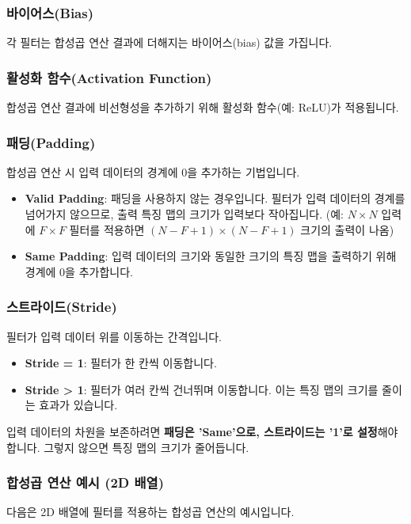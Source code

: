 \documentclass[11pt,a4paper]{article}
\theoremstyle{definition}
\begin{document}
\subsubsection{바이어스(Bias)}
각 필터는 합성곱 연산 결과에 더해지는 바이어스(bias) 값을 가집니다.

\subsubsection{활성화 함수(Activation Function)}
합성곱 연산 결과에 비선형성을 추가하기 위해 활성화 함수(예: ReLU)가 적용됩니다.

\subsubsection{패딩(Padding)}
합성곱 연산 시 입력 데이터의 경계에 0을 추가하는 기법입니다.
\begin{itemize}
    \item \textbf{Valid Padding}: 패딩을 사용하지 않는 경우입니다. 필터가 입력 데이터의 경계를 넘어가지 않으므로, 출력 특징 맵의 크기가 입력보다 작아집니다. (예: $N \times N$ 입력에 $F \times F$ 필터를 적용하면 $(N-F+1) \times (N-F+1)$ 크기의 출력이 나옴)
    \item \textbf{Same Padding}: 입력 데이터의 크기와 동일한 크기의 특징 맵을 출력하기 위해 경계에 0을 추가합니다.
\end{itemize}

\subsubsection{스트라이드(Stride)}
필터가 입력 데이터 위를 이동하는 간격입니다.
\begin{itemize}
    \item \textbf{Stride = 1}: 필터가 한 칸씩 이동합니다.
    \item \textbf{Stride > 1}: 필터가 여러 칸씩 건너뛰며 이동합니다. 이는 특징 맵의 크기를 줄이는 효과가 있습니다.
\end{itemize}
\begin{tcolorbox}[warningbox, title=\textbf{주의}]
입력 데이터의 차원을 보존하려면 \textbf{패딩은 'Same'으로, 스트라이드는 '1'로 설정}해야 합니다. 그렇지 않으면 특징 맵의 크기가 줄어듭니다.
\end{tcolorbox}

\subsubsection{합성곱 연산 예시 (2D 배열)}
다음은 2D 배열에 필터를 적용하는 합성곱 연산의 예시입니다.
\end{document}
